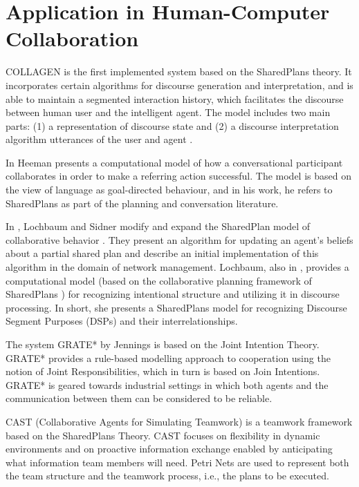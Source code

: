\documentclass[11pt]{article}
\begin{document}
\section{Application in Human-Computer Collaboration}
\label{sec:applicaiton}

COLLAGEN \cite{rich:collaboration-manager,rich:discourse} is the first
implemented system based on the SharedPlans theory. It incorporates certain
algorithms for discourse generation and interpretation, and is able to maintain
a segmented interaction history, which facilitates the discourse between human
user and the intelligent agent. The model includes two main parts: (1) a
representation of discourse state and (2) a discourse interpretation algorithm
utterances of the user and agent \cite{rickel:discourse-theory-dialogue}.

In \cite{heeman:model-collaboration-referring} Heeman presents a computational
model of how a conversational participant collaborates in order to make a
referring action successful. The model is based on the view of language as
goal-directed behaviour, and in his work, he refers to SharedPlans as part of
the planning and conversation literature.

In \cite{lochbaum:plan-models}, Lochbaum and Sidner modify and expand the
SharedPlan model of collaborative behavior \cite{grosz:plans-discourse}. They
present an algorithm for updating an agent’s beliefs about a partial shared plan
and describe an initial implementation of this algorithm in the domain of
network management. Lochbaum, also in \cite{lochbaum:collaborative-planning},
provides a computational model (based on the collaborative planning framework
of SharedPlans \cite{grosz:collaboration}) for recognizing intentional structure
and utilizing it in discourse processing. In short, she presents a SharedPlans
model for recognizing Discourse Segment Purposes (DSPs)
\cite{grosz:plans-discourse} \cite{sidner:discourse-collaborative-negotiation}
and their interrelationships.

The system GRATE* by Jennings \cite{jennings:joint-intention-hybrid} is based on
the Joint Intention Theory. GRATE* provides a rule-based modelling approach to
cooperation using the notion of Joint Responsibilities, which in turn is based
on Join Intentions. GRATE* is geared towards industrial settings in which both
agents and the communication between them can be considered to be reliable.

CAST (Collaborative Agents for Simulating Teamwork) \cite{yen:cast}
\cite{yin:knowledge-based-sharedplans} is a teamwork framework based on the
SharedPlans Theory. CAST focuses on flexibility in dynamic environments and on
proactive information exchange enabled by anticipating what information team
members will need. Petri Nets are used to represent both the team structure and
the teamwork process, i.e., the plans to be executed.
\end{document}
